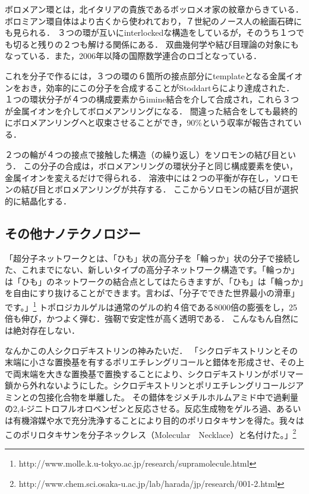 \documentclass[uplatex, dvipdfmx]{jsreport}
\begin{document}
\begin{example}\label{example-Borromean-ring}
    ボロメアン環とは，北イタリアの貴族であるボッロメオ家の紋章からきている．
    ボロミアン環自体はより古くから使われており，７世紀のノース人の絵画石碑にも見られる．
    ３つの環が互いにinterlockedな構造をしているが，そのうち１つでも切ると残りの２つも解ける関係にある．
    双曲幾何学や結び目理論の対象にもなっている．また，2006年以降の国際数学連合のロゴとなっている．

    これを分子で作るには，３つの環の６箇所の接点部分にtemplateとなる金属イオンをおき，効率的にこの分子を合成することがStoddartらにより達成された\cite{Borromean ring by Stoddart}．
    １つの環状分子が４つの構成要素からimine結合を介して合成され，これら３つが金属イオンを介してボロメアンリングになる．
    間違った結合をしても最終的にボロメアンリングへと収束させることができ，90\%という収率が報告されている．
\end{example}

\begin{example}
    ２つの輪が４つの接点で接触した構造（の繰り返し）をソロモンの結び目という．
    この分子の合成は，ボロメアンリングの環状分子と同じ構成要素を使い，金属イオンを変えるだけで得られる．
    溶液中には２つの平衡が存在し，ソロモンの結び目とボロメアンリングが共存する．
    ここからソロモンの結び目が選択的に結晶化する．
\end{example}

\subsection{その他ナノテクノロジー}

\begin{example}
    「超分子ネットワークとは、「ひも」状の高分子を「輪っか」状の分子で接続した、これまでにない、新しいタイプの高分子ネットワーク構造です。「輪っか」は「ひも」のネットワークの結合点としてはたらきますが、「ひも」は「輪っか」を自由にすり抜けることができます。言わば、「分子でできた世界最小の滑車」です。」\footnote{http://www.molle.k.u-tokyo.ac.jp/research/supramolecule.html}
    トポロジカルゲルは通常のゲルの約４倍である8000倍の膨張をし，25倍も伸び，かつよく弾む．強靭で安定性が高く透明である\cite{有賀克彦}．
    こんなもん自然には絶対存在しない．
\end{example}

\begin{example}
    なんかこの人シクロデキストリンの神みたいだ．
    「シクロデキストリンとその末端に小さな置換基を有するポリエチレングリコールと錯体を形成させ、その上で両末端を大きな置換基で置換することにより、シクロデキストリンがポリマー鎖から外れないようにした。シクロデキストリンとポリエチレングリコールジアミンとの包接化合物を単離した。
    その錯体をジメチルホルムアミド中で過剰量の2,4-ジニトロフルオロベンゼンと反応させる。反応生成物をゲルろ過、あるいは有機溶媒や水で充分洗浄することにより目的のポリロタキサンを得た。我々はこのポリロタキサンを分子ネックレス（Molecular　Necklace）と名付けた。」\footnote{http://www.chem.sci.osaka-u.ac.jp/lab/harada/jp/research/001-2.html}
\end{example}
\end{document}
